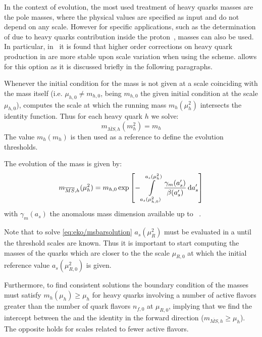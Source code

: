 In the context of \pdf{} evolution, the most used treatment of heavy quarks masses are the pole masses,
where the physical values are specified as input and do not depend on any scale.
However for specific applications, such as the determination of \mhou{} due to heavy quarks contribution 
inside the proton~\cite{Ball:2016neh}, \msbar{} masses can also be used.
In particular, in~\cite{Alekhin:2010sv} it is found that higher order corrections on heavy quark production
in \dis{} are more stable upon scale variation when using the \msbar{} scheme.
\eko{} allows for this option as it is discussed briefly in the following paragraphs.

Whenever the initial condition for the mass is not given at a scale coinciding with
the mass itself (i.e. $\mu_{h,0} \neq m_{h,0}$, being $m_{h,0}$ the given initial condition
at the scale $\mu_{h,0}$),
\eko{} computes the scale at which the running mass $m_{h}(\mu_h^2)$ intersects
the identity function.
Thus for each heavy quark $h$ we solve:
%
\begin{equation}
    m_{\overline{MS},h}(m_h^2) = m_h
\end{equation}
The value $m_h(m_h)$ is then used as a reference to define the evolution thresholds.

The evolution of the \msbar{} mass is given by:
%
\begin{equation}
    m_{\overline{MS},h}(\mu_h^2) = m_{h,0} \exp\qty[ - \int\limits_{a_s(\mu_{h,0}^2)}^{a_s(\mu_h^2)} \frac{\gamma_m(a_s')}{\beta(a_s')} \dd{a_s'} ]
    \label{eq:eko/msbarsolution}
\end{equation}
%
with $\gamma_m(a_s)$ the \qcd{} anomalous mass dimension available up to 
\nnnlo{}~\cite{Vermaseren:1997fq,Schroder:2005hy,Chetyrkin:2005ia}.

Note that to solve \cref{eq:eko/msbarsolution} $a_s(\mu_R^2)$ must be evaluated in 
a \ffns{} until the threshold scales are known. Thus it is important
to start computing the \msbar{} masses of the quarks which are closer to the
the scale $\mu_{R,0}$ at which the initial reference value $a_s(\mu_{R,0}^2)$ is given. 

Furthermore, to find consistent solutions the boundary condition of the
\msbar{} masses must satisfy $m_h(\mu_h) \ge \mu_h$ for heavy quarks involving
a number of active flavors greater than the number of quark flavors $n_{f,0}$ at $\mu_{R,0}$, implying that we find
the intercept between the \rge{} and the identity in the forward direction ($m_{\overline{MS},h} \ge \mu_h$).
The opposite holds for scales related to fewer active flavors.
